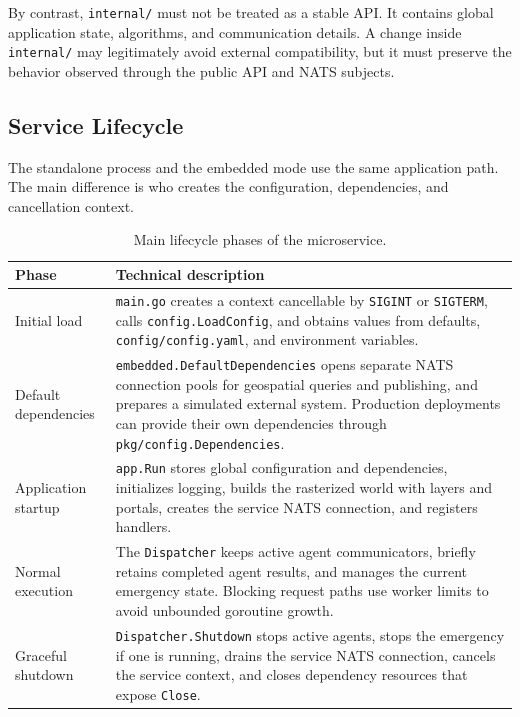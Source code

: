 \documentclass[12pt,a4paper]{report}
\begin{document}
By contrast, \texttt{internal/} must not be treated as a stable API. It contains
global application state, algorithms, and communication details. A change inside
\texttt{internal/} may legitimately avoid external compatibility, but it must
preserve the behavior observed through the public API and NATS subjects.

\subsection{Service Lifecycle}

The standalone process and the embedded mode use the same application path. The
main difference is who creates the configuration, dependencies, and cancellation
context.

\begin{table}[H]
\centering
\begin{tabular}{|p{}|p{}|}
\hline
\textbf{Phase} & \textbf{Technical description} \\
\hline
Initial load &
\texttt{main.go} creates a context cancellable by \texttt{SIGINT} or
\texttt{SIGTERM}, calls \texttt{config.LoadConfig}, and obtains values from
defaults, \texttt{config/config.yaml}, and environment variables. \\
\hline
Default dependencies &
\texttt{embedded.DefaultDependencies} opens separate NATS connection pools for
geospatial queries and publishing, and prepares a simulated external system.
Production deployments can provide their own dependencies through
\texttt{pkg/config.Dependencies}. \\
\hline
Application startup &
\texttt{app.Run} stores global configuration and dependencies, initializes
logging, builds the rasterized world with layers and portals, creates the
service NATS connection, and registers handlers. \\
\hline
Normal execution &
The \texttt{Dispatcher} keeps active agent communicators, briefly retains
completed agent results, and manages the current emergency state. Blocking
request paths use worker limits to avoid unbounded goroutine growth. \\
\hline
Graceful shutdown &
\texttt{Dispatcher.Shutdown} stops active agents, stops the emergency if one is
running, drains the service NATS connection, cancels the service context, and
closes dependency resources that expose \texttt{Close}. \\
\hline
\end{tabular}
\caption{Main lifecycle phases of the microservice.}
\end{table}
\end{document}

